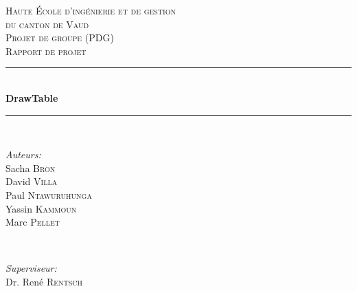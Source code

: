 \documentclass[11pt,a4paper,oldfontcommands]{memoir}
\begin{document}
\begin{titlepage}

\newcommand{\HRule}{\rule{\linewidth}{0.5mm}}

\center
 

\textsc{\LARGE Haute École d'ingénierie et de gestion \\du canton de Vaud}\\[1.5cm]
\textsc{\Large Projet de groupe (PDG)}\\[0.5cm]
\textsc{\large Rapport de projet}\\[0.5cm]


\HRule \\[0.8cm]
{ \huge \bfseries DrawTable}\\[0.4cm]
\HRule \\[1.5cm]
 

\begin{minipage}{0.4\textwidth}
\begin{flushleft} \large
\emph{Auteurs:}\\
Sacha \textsc{Bron}\\
David \textsc{Villa}\\
Paul \textsc{Ntawuruhunga}\\
Yassin \textsc{Kammoun}\\
Marc \textsc{Pellet}
\end{flushleft}
\end{minipage}
~
\begin{minipage}{0.4\textwidth}
\begin{flushright} \large
\emph{Superviseur:} \\
Dr. René \textsc{Rentsch}
\break 
\break 
\break 
\break 
\end{flushright}
\end{minipage}\\[4cm]


\end{titlepage}
\end{document}
